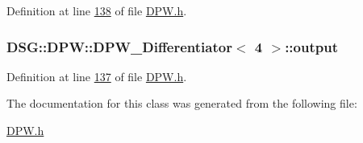 Definition at line \hyperlink{_d_p_w_8h_source_l00138}{138} of file \hyperlink{_d_p_w_8h_source}{D\+P\+W.\+h}.

\hypertarget{class_d_s_g_1_1_d_p_w_1_1_d_p_w___differentiator_3_014_01_4_a5fd7e2dc19c470cacb8e23942c1afdbb}{
\subsubsection[{output}]{ {\bf D\+S\+G\+::\+D\+P\+W\+::\+D\+P\+W\+\_\+\+Differentiator}$<$ 4 $>$\+::output\hspace{0.3cm}{\ttfamily [protected]}}}\label{class_d_s_g_1_1_d_p_w_1_1_d_p_w___differentiator_3_014_01_4_a5fd7e2dc19c470cacb8e23942c1afdbb}


Definition at line \hyperlink{_d_p_w_8h_source_l00137}{137} of file \hyperlink{_d_p_w_8h_source}{D\+P\+W.\+h}.



The documentation for this class was generated from the following file\+:\begin{DoxyCompactItemize}
\item 
\hyperlink{_d_p_w_8h}{D\+P\+W.\+h}\end{DoxyCompactItemize}

